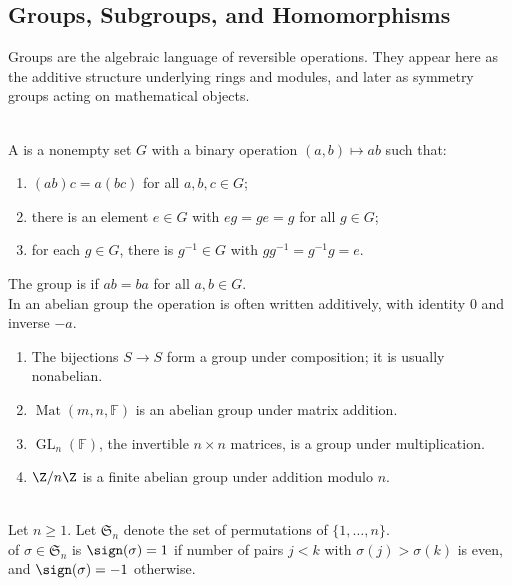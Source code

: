 \subsection{Groups, Subgroups, and Homomorphisms}

Groups are the algebraic language of reversible operations. They appear here as the additive structure underlying rings and modules, and later as symmetry groups acting on mathematical objects.

\begin{definition} \label{def:group-and-abelian-group} \\
A  is a nonempty set $G$ with a binary operation $(a,b)\mapsto ab$ such that:
\begin{enumerate}[label=(\roman*)]
\setlength{\itemsep}{0pt}
\item $(ab)c=a(bc)$ for all $a,b,c\in G$;
\item there is an element $e\in G$ with $eg=ge=g$ for all $g\in G$;
\item for each $g\in G$, there is $g^{-1}\in G$ with $gg^{-1}=g^{-1}g=e$.
\end{enumerate}
The group is  if $ab=ba$ for all $a,b\in G$.\\
In an abelian group the operation is often written additively, with identity $0$ and inverse $-a$.
\end{definition}

\begin{example} \label{ex:basic-groups-from-linear-algebra} 
\begin{enumerate}[label=(\roman*)]
\setlength{\itemsep}{0pt}
\item The bijections $S\to S$ form a group under composition; it is usually nonabelian.
\item $\operatorname{Mat}(m,n,\mathbb{F})$ is an abelian group under matrix addition.
\item $\operatorname{GL}_n(\mathbb{F})$, the invertible $n\times n$ matrices, is a group under multiplication.
\item $\Z/n\Z$ is a finite abelian group under addition modulo $n$.
\end{enumerate}
\end{example}

\begin{definition} \label{def:permutations-and-sign} \\
Let $n\geq1$. Let $\mathfrak{S}_n$ denote the set of permutations of $\{1,\ldots,n\}$.\\
 of $\sigma\in\mathfrak{S}_n$ is $\sign(\sigma)=1$ if number of pairs $j<k$ with $\sigma(j)>\sigma(k)$ is even, and $\sign(\sigma)=-1$ otherwise.
\end{definition}

